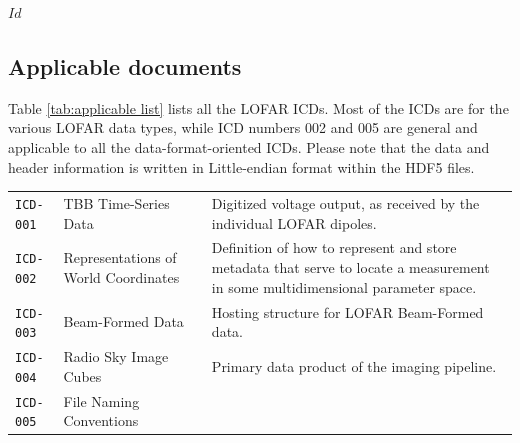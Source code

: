 \svnInfo $Id$

\subsection{Applicable documents}
\label{sec:applicable documents}

Table \ref{tab:applicable list} lists all the LOFAR ICDs.  Most of the ICDs are for the various LOFAR data types, while ICD numbers 002 and 005 are general and applicable to all the data-format-oriented ICDs.  Please note that the data and header information is written in Little-endian format within the HDF5 files.

\begin{center}
  \tablelasttail{\hline}
  \begin{supertabular}{lp{5.8cm}p{7cm}}
    \shrinkheight{-4.5em}
    \texttt{ICD-001} \cite{lofar.icd.001} & TBB Time-Series Data & Digitized
    voltage output, as received by the individual LOFAR dipoles. \\
    \texttt{ICD-002} \cite{lofar.icd.002} & Representations of World
    Coordinates & Definition of how to represent and store metadata
    that serve to locate a measurement in some multidimensional parameter space. \\
    \texttt{ICD-003} \cite{lofar.icd.003} & Beam-Formed Data & Hosting
    structure for LOFAR Beam-Formed data. \\
    \texttt{ICD-004} \cite{lofar.icd.004} & Radio Sky Image Cubes &
    Primary data product of the imaging pipeline. \\
    \texttt{ICD-005} \cite{lofar.icd.005} & File Naming Conventions &

\end{supertabular}
\end{center}
